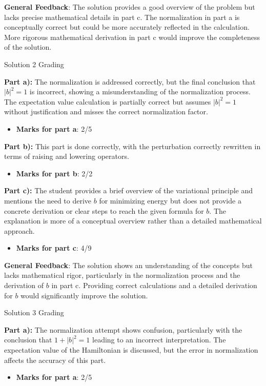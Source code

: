\documentclass[a4paper,11pt]{article}
\begin{document}
\textbf{General Feedback}: The solution provides a good overview of the problem but lacks precise mathematical details in part c. The normalization in part a is conceptually correct but could be more accurately reflected in the calculation. More rigorous mathematical derivation in part c would improve the completeness of the solution.

Solution 2 Grading

\textbf{Part a):} The normalization is addressed correctly, but the final conclusion that \(|b|^2 = 1\) is incorrect, showing a misunderstanding of the normalization process. The expectation value calculation is partially correct but assumes \(|b|^2 = 1\) without justification and misses the correct normalization factor.
\begin{itemize}
    \item \textbf{Marks for part a}: 2/5
\end{itemize}

\textbf{Part b):} This part is done correctly, with the perturbation correctly rewritten in terms of raising and lowering operators.
\begin{itemize}
    \item \textbf{Marks for part b}: 2/2
\end{itemize}

\textbf{Part c):} The student provides a brief overview of the variational principle and mentions the need to derive \(b\) for minimizing energy but does not provide a concrete derivation or clear steps to reach the given formula for \(b\). The explanation is more of a conceptual overview rather than a detailed mathematical approach.
\begin{itemize}
    \item \textbf{Marks for part c}: 4/9
\end{itemize}

\textbf{General Feedback}: The solution shows an understanding of the concepts but lacks mathematical rigor, particularly in the normalization process and the derivation of \(b\) in part c. Providing correct calculations and a detailed derivation for \(b\) would significantly improve the solution.

Solution 3 Grading

\textbf{Part a):} The normalization attempt shows confusion, particularly with the conclusion that \(1 + |b|^2 = 1\) leading to an incorrect interpretation. The expectation value of the Hamiltonian is discussed, but the error in normalization affects the accuracy of this part.
\begin{itemize}
    \item \textbf{Marks for part a}: 2/5
\end{itemize}
\end{document}
